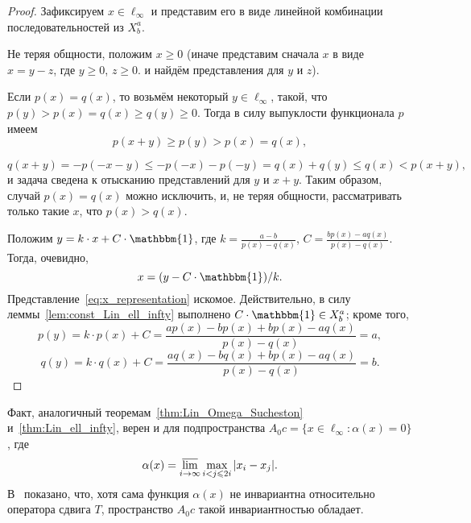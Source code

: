 \documentclass[a4paper,14pt]{article} %
\theoremstyle{plain}
\begin{document}
\begin{proof}
	Зафиксируем $x \in \ell_\infty$ и представим его в виде линейной комбинации последовательностей из $X^a_b$.

	Не теряя общности, положим $x\geq 0$
	(иначе представим сначала $x$ в виде $x = y - z$, где $y \geq 0$, $z \geq 0$.
	и найдём представления для $y$ и $z$).

	Если $p(x) = q(x)$, то возьмём некоторый $y\in\ell_\infty$,
	такой, что $p(y) > p(x) = q(x)  \geq q(y) \geq 0$.
	Тогда в силу выпуклости функционала $p$ имеем
	\begin{equation}
		p(x+y) \geq p(y) > p(x) = q(x)
		,
	\end{equation}


	\begin{equation}
		q(x+y) = -p(-x-y) \leq -p(-x) -p(-y) = q(x) + q(y) \leq q(x) < p(x+y)
		,
	\end{equation}
	и задача сведена к отысканию представлений для $y$ и $x+y$.
	Таким образом, случай $p(x) = q(x)$ можно исключить,
	и, не теряя общности, рассматривать только такие $x$, что $p(x) > q(x)$.

	Положим $y=k\cdot x + C\cdot\mathbbm{1}$,
	где $k=\frac{a-b}{p(x)-q(x)}$, $C=\frac{bp(x)-aq(x)}{p(x)-q(x)}$.
	Тогда, очевидно,
	\begin{equation}
		\label{eq:x_representation}
		x=(y-C\cdot\mathbbm{1})/k
		.
	\end{equation}
	Представление~\eqref{eq:x_representation} искомое.
	Действительно, в силу леммы~\ref{lem:const_Lin_ell_infty} выполнено
	$C\cdot\mathbbm{1}\in X^a_b$; кроме того,
	\begin{equation}
		p(y) = k\cdot p(x) + C
		=
		\frac{ap(x)-bp(x)+bp(x)-aq(x)}{p(x)-q(x)}
		=
		a
		,
	\end{equation}
	\begin{equation}
		q(y) = k\cdot q(x) + C
		=
		\frac{aq(x)-bq(x)+bp(x)-aq(x)}{p(x)-q(x)}
		=
		b
		.
	\end{equation}
\end{proof}

Факт, аналогичный теоремам~\ref{thm:Lin_Omega_Sucheston} и~\ref{thm:Lin_ell_infty}, верен и для подпространства
$A_0 c = \{ x \in \ell_\infty : \alpha(x) =0 \}$,
где~\cite{our-vzms-2018}
\begin{equation*}
	\alpha(x) = \varlimsup_{i\to\infty} \max_{i<j\leqslant 2i} |x_i - x_j|
	.
\end{equation*}
В~\cite{our-ped-2018-alpha-Tx} показано, что, хотя сама функция $\alpha(x)$ не инвариантна относительно оператора сдвига $T$,
пространство $A_0 c$ такой инвариантностью обладает.
\end{document}
